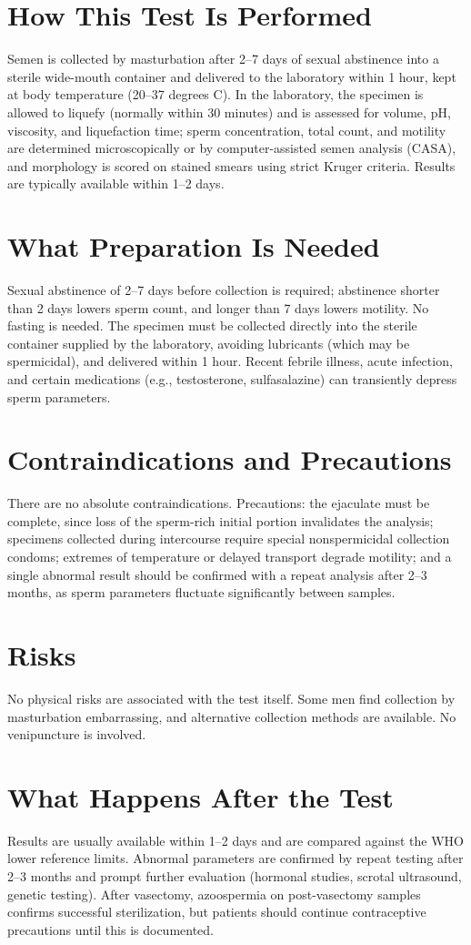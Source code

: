 \section*{How This Test Is Performed}
Semen is collected by masturbation after 2--7 days of sexual abstinence into a sterile wide-mouth container and delivered to the laboratory within 1 hour, kept at body temperature (20--37 degrees C). In the laboratory, the specimen is allowed to liquefy (normally within 30 minutes) and is assessed for volume, pH, viscosity, and liquefaction time; sperm concentration, total count, and motility are determined microscopically or by computer-assisted semen analysis (CASA), and morphology is scored on stained smears using strict Kruger criteria. Results are typically available within 1--2 days.
\section*{What Preparation Is Needed}
Sexual abstinence of 2--7 days before collection is required; abstinence shorter than 2 days lowers sperm count, and longer than 7 days lowers motility. No fasting is needed. The specimen must be collected directly into the sterile container supplied by the laboratory, avoiding lubricants (which may be spermicidal), and delivered within 1 hour. Recent febrile illness, acute infection, and certain medications (e.g., testosterone, sulfasalazine) can transiently depress sperm parameters.
\section*{Contraindications and Precautions}
There are no absolute contraindications. Precautions: the ejaculate must be complete, since loss of the sperm-rich initial portion invalidates the analysis; specimens collected during intercourse require special nonspermicidal collection condoms; extremes of temperature or delayed transport degrade motility; and a single abnormal result should be confirmed with a repeat analysis after 2--3 months, as sperm parameters fluctuate significantly between samples.
\section*{Risks}
No physical risks are associated with the test itself. Some men find collection by masturbation embarrassing, and alternative collection methods are available. No venipuncture is involved.
\section*{What Happens After the Test}
Results are usually available within 1--2 days and are compared against the WHO lower reference limits. Abnormal parameters are confirmed by repeat testing after 2--3 months and prompt further evaluation (hormonal studies, scrotal ultrasound, genetic testing). After vasectomy, azoospermia on post-vasectomy samples confirms successful sterilization, but patients should continue contraceptive precautions until this is documented.
